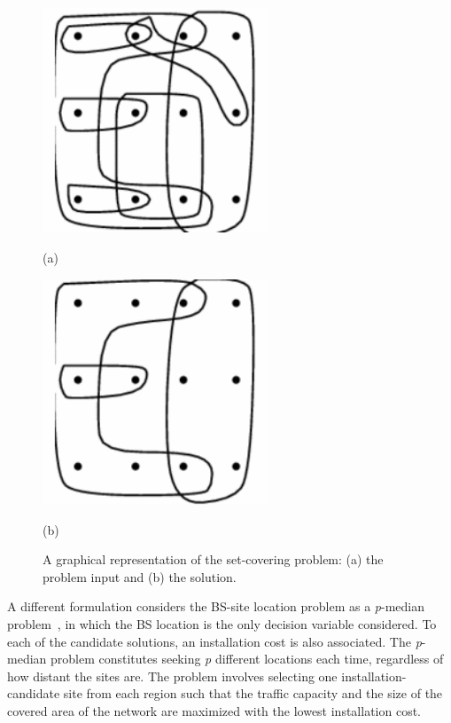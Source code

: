 \begin{figure}[H]
\centering

\begin{minipage}[c]{0.45\textwidth}%
\centering

\includegraphics[width=0.6\textwidth]{02-background_and_motivation/img/set_cover_in}

(a)%
\end{minipage}\hfill{}%
\begin{minipage}[c]{0.45\textwidth}%
\centering

\includegraphics[width=0.6\textwidth]{02-background_and_motivation/img/set_cover_out}

(b)%
\end{minipage}\caption{A graphical representation of the set-covering problem: (a) the problem
input and (b) the solution.\label{fig:02-Minimum_set_covering_problem}}
\end{figure}


A different formulation considers the BS-site location problem as
a \emph{p}-median problem~\cite{Yang-UMTS_base_station_location_planning:2007},
in which the BS location is the only decision variable considered.
To each of the candidate solutions, an installation cost is also associated.
The \emph{p}-median problem constitutes seeking \emph{p} different
locations each time, regardless of how distant the sites are. The
problem involves selecting one installation-candidate site from each
region such that the traffic capacity and the size of the covered
area of the network are maximized with the lowest installation cost.


